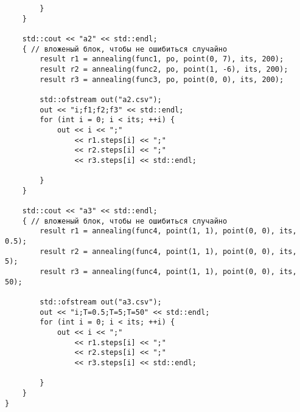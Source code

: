 \documentclass[14pt]{matmex-diploma-custom}
\begin{document}
\begin{verbatim}
        }
    }

    std::cout << "a2" << std::endl;
    { // вложеный блок, чтобы не ошибиться случайно
        result r1 = annealing(func1, po, point(0, 7), its, 200);
        result r2 = annealing(func2, po, point(1, -6), its, 200);
        result r3 = annealing(func3, po, point(0, 0), its, 200);

        std::ofstream out("a2.csv");
        out << "i;f1;f2;f3" << std::endl;
        for (int i = 0; i < its; ++i) {
            out << i << ";"
                << r1.steps[i] << ";"
                << r2.steps[i] << ";"
                << r3.steps[i] << std::endl;

        }
    }

    std::cout << "a3" << std::endl;
    { // вложеный блок, чтобы не ошибиться случайно
        result r1 = annealing(func4, point(1, 1), point(0, 0), its, 0.5);
        result r2 = annealing(func4, point(1, 1), point(0, 0), its, 5);
        result r3 = annealing(func4, point(1, 1), point(0, 0), its, 50);

        std::ofstream out("a3.csv");
        out << "i;T=0.5;T=5;T=50" << std::endl;
        for (int i = 0; i < its; ++i) {
            out << i << ";"
                << r1.steps[i] << ";"
                << r2.steps[i] << ";"
                << r3.steps[i] << std::endl;

        }
    }
}


\end{verbatim}
\end{document}
